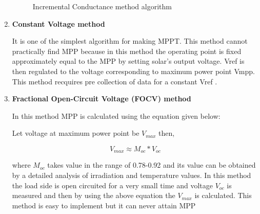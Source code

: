 \documentclass[a4paper,12pt]{iitmdiss}
\begin{document}
\begin{enumerate}
\begin{figure}[hbt!]
        \caption{Incremental Conductance method algorithm}
    \label{fig:3.5}
    \end{figure}
    
    \item \textbf{Constant Voltage method}
    
    It is one of the simplest algorithm for making MPPT. This method cannot practically find MPP because in this method the operating point is fixed approximately equal to the MPP by setting solar's output voltage. Vref is then regulated to the voltage corresponding to maximum power point Vmpp. This method recquires pre collection of data for a constant Vref \textcolor{blue}{\cite{al2018review}}.
    
    \item \textbf{Fractional Open-Circuit Voltage (FOCV) method}
    
    In this method MPP is calculated using the equation given below:
    
    Let voltage at maximum power point be $V_{max}$ then,
    
    \begin{equation}
        V_{max}\approx M_{oc}*V_{oc}
    \end{equation}
    
    where $M_{oc}$ takes value in the range of 0.78-0.92 and its value can be obtained by a detailed analysis of irradiation and temperature values. In this method the load side is open circuited for a very small time and voltage $V_{oc}$ is measured and then by using the above equation the $V_{max}$ is calculated. This method is easy to implement but it can never attain MPP \textcolor{blue}{\cite{al2018review}}
    
    
\end{enumerate}
\end{document}
